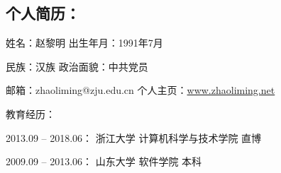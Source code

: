 \begin{publications}
\section*{个人简历：}
姓名：赵黎明 \qquad\qquad\qquad\qquad\qquad\quad 出生年月：1991年7月

民族：汉族 \qquad\qquad\qquad\qquad\qquad\qquad 政治面貌：中共党员

邮箱：zhaoliming@zju.edu.cn \quad\quad\quad\quad\hspace{0.3em}  个人主页：\href{http://www.zhaoliming.net}{www.zhaoliming.net} 
 
\vspace{1.0em}
教育经历：
\begin{asparaitem}                                                
\item{2013.09 – 2018.06： \quad 浙江大学 \qquad 计算机科学与技术学院 \qquad       直博}
\item{2009.09 – 2013.06： \quad 山东大学 \qquad 软件学院 \qquad\qquad\qquad\qquad 本科}  
\end{asparaitem}


\end{publications}
